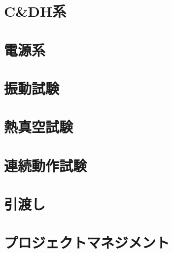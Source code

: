 \section{C\&DH系}

\section{電源系}

\section{振動試験}

\section{熱真空試験}

\section{連続動作試験}

\section{引渡し}

\section{プロジェクトマネジメント}

